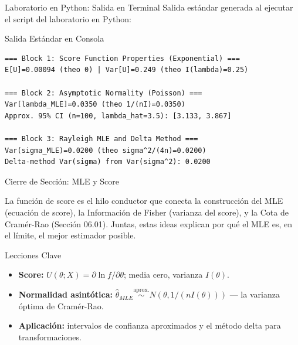 \documentclass[10pt, aspectratio=169]{beamer}
\begin{document}
\begin{frame}[fragile]{Laboratorio en Python: Salida en Terminal}
  \scriptsize
  Salida estándar generada al ejecutar el script del laboratorio en Python:
  \vspace{0.02cm}
  \begin{block}{Salida Estándar en Consola}
    \fontsize{4pt}{5pt}\selectfont
    \begin{verbatim}
=== Block 1: Score Function Properties (Exponential) ===
E[U]=0.00094 (theo 0) | Var[U]=0.249 (theo I(lambda)=0.25)

=== Block 2: Asymptotic Normality (Poisson) ===
Var[lambda_MLE]=0.0350 (theo 1/(nI)=0.0350)
Approx. 95% CI (n=100, lambda_hat=3.5): [3.133, 3.867]

=== Block 3: Rayleigh MLE and Delta Method ===
Var(sigma_MLE)=0.0200 (theo sigma^2/(4n)=0.0200)
Delta-method Var(sigma) from Var(sigma^2): 0.0200
    \end{verbatim}
  \end{block}
\end{frame}






\begin{frame}{Cierre de Sección: MLE y Score}
  \begin{reflexion}
    La función de score es el hilo conductor que conecta la construcción del MLE (ecuación de score), la Información de Fisher (varianza del score), y la Cota de Cramér-Rao (Sección 06.01). Juntas, estas ideas explican por qué el MLE es, en el límite, el mejor estimador posible.
  \end{reflexion}

  \vspace{0.2cm}
  \pause
  \begin{block}{Lecciones Clave}
    \begin{itemize}\itemsep=0.08cm
      \item \textbf{Score:} $U(\theta;X)=\partial\ln f/\partial\theta$; media cero, varianza $I(\theta)$.
      \item \textbf{Normalidad asintótica:} $\hat\theta_{MLE} \overset{\text{aprox.}}{\sim} N(\theta, 1/(nI(\theta)))$ --- la varianza óptima de Cramér-Rao.
      \item \textbf{Aplicación:} intervalos de confianza aproximados y el método delta para transformaciones.
    \end{itemize}
  \end{block}
\end{frame}
\end{document}
